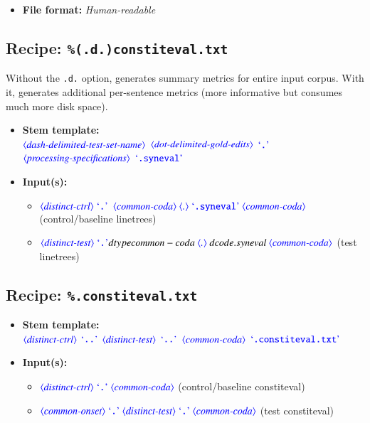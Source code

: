 \documentclass[12pt]{report}
\def\blue{\color{blue}}
\begin{document}
\begin{itemize}
\item\textbf{File format:} \textit{Human-readable}
\end{itemize}

\subsection{Recipe: {\blue\tt \%(.d.)constiteval.txt}}

Without the {\blue\tt .d.} option, generates summary metrics for entire input corpus. With it, generates additional per-sentence metrics (more informative but consumes much more disk space).

\begin{itemize}
      \item \textbf{Stem template:}\\
      $\dtype{dash-delimited-test-set-name}$ $\dtype{dot-delimited-gold-edits}$ $\dcode{.}$ $\dtype{processing-specifications}$ $\dcode{.syneval}$
      \item \textbf{Input(s):}
      \begin{itemize}
            \item  $\dtype{distinct-ctrl} \ \dcode{.} \ \ \dtype{common-coda} \ \dtype{.} \ \dcode{.syneval} \ \dtype{common-coda}$ (control/baseline linetrees)
            \item  $\dtype{distinct-test} \ \dcode{.} \ \\dtype{common-coda} \ \dtype{.} \ dcode{.syneval} \ \dtype{common-coda}$ (test linetrees)
      \end{itemize}
\end{itemize}

\subsection{Recipe: {\blue\tt \%.constiteval.txt}}

\begin{itemize}
      \item \textbf{Stem template:}\\
      $\dtype{distinct-ctrl}$ $\dcode{..}$ $\dtype{distinct-test}$ $\dcode{..}$ $\dtype{common-coda}$ $\dcode{.constiteval.txt}$
      \item \textbf{Input(s):}
      \begin{itemize}
            \item  $\dtype{distinct-ctrl} \ \dcode{.} \ \dtype{common-coda}$ (control/baseline constiteval)
            \item  $\dtype{common-onset} \ \dcode{.} \ \dtype{distinct-test} \ \dcode{.} \ \dtype{common-coda}$ (test constiteval)
      \end{itemize}
\end{itemize}
\end{document}
